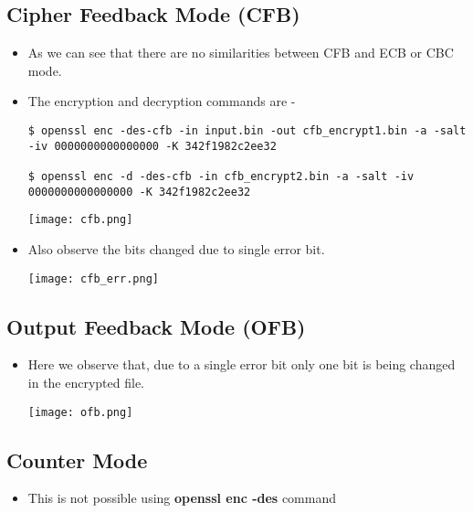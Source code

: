\documentclass[12pt, a4]{article}
\begin{document}
\subsection{Cipher Feedback Mode (CFB)}
\begin{itemize}
\item As we can see that there are no similarities between CFB and ECB or CBC mode.
\item The encryption and decryption commands are -
\begin{lstlisting}
$ openssl enc -des-cfb -in input.bin -out cfb_encrypt1.bin -a -salt -iv 0000000000000000 -K 342f1982c2ee32

$ openssl enc -d -des-cfb -in cfb_encrypt2.bin -a -salt -iv 0000000000000000 -K 342f1982c2ee32
\end{lstlisting}
\begin{center}
\texttt{[image: cfb.png]}
\end{center}
\item Also observe the bits changed due to single error bit.
\begin{center}
\texttt{[image: cfb\_err.png]}
\end{center}

\end{itemize}
\subsection{Output Feedback Mode (OFB)}
\begin{itemize}
\item Here we observe that, due to a single error bit only one bit is being changed in the encrypted file.
\begin{center}
\texttt{[image: ofb.png]}
\end{center}
\end{itemize}

\subsection{Counter Mode}
\begin{itemize}
\item This is not possible using \textbf{openssl enc -des} command
\end{itemize}
\end{document}
